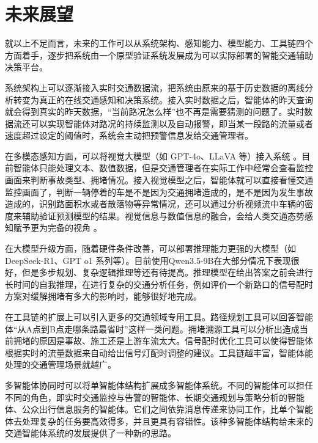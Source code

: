 \section{未来展望}

就以上不足而言，未来的工作可以从系统架构、感知能力、模型能力、工具链四个方面着手，逐步把系统由一个原型验证系统发展成为可以实际部署的智能交通辅助决策平台。

系统架构上可以逐渐接入实时交通数据流，把系统由原来的基于历史数据的离线分析转变为真正的在线交通感知和决策系统。接入实时数据之后，智能体的昨天查询就会得到真实的昨天数据，“当前路况怎么样”也不再是需要猜测的问题了。实时数据流还可以实现智能体对路况的持续监测以及自动报警，即当某一段路的流量或者速度超过设定的阈值时，系统会主动把预警信息发给交通管理者。

在多模态感知方面，可以将视觉大模型（如 GPT-4o、LLaVA 等）接入系统 。目前智能体只能处理文本、数值数据，但是交通管理者在实际工作中经常会查看监控画面来判断事故类型、拥堵情况。接入视觉模型之后，智能体就可以直接看懂交通监控画面了，判断一辆停着的车是不是因为交通拥堵造成的，是不是因为发生事故造成的，识别路面积水或者散落物等异常情况，还可以通过分析视频流中车辆的密度来辅助验证预测模型的结果。视觉信息与数值信息的融合，会给人类交通态势感知赋予更为完备的视角 。

在大模型升级方面，随着硬件条件改善，可以部署推理能力更强的大模型（如 DeepSeek-R1、GPT o1 系列等）。目前使用Qwen3.5-9B在大部分情况下表现很好，但是多步规划、复杂逻辑推理等还有待提高。推理模型在给出答案之前会进行长时间的自我推理，在进行复杂的交通分析任务，例如评价一个新路口的信号配时方案对缓解拥堵有多大的影响时，能够很好地完成。

在工具链的扩展上可以引入更多的交通领域专用工具。路径规划工具可以回答智能体“从A点到B点走哪条路最省时”这样一类问题。拥堵溯源工具可以分析出造成当前拥堵的原因是事故、施工还是上游车流太大。信号配时优化工具可以使得智能体根据实时的流量数据来自动给出信号灯配时调整的建议。工具链越丰富，智能体能处理的交通管理场景就越广。

多智能体协同时可以将单智能体结构扩展成多智能体系统。不同的智能体可以担任不同的角色，即实时交通监控与告警的智能体、长期交通规划与策略分析的智能体、公众出行信息服务的智能体。它们之间依靠消息传递来协同工作，比单个智能体去处理复杂的任务要高效得多，并且更具有容错性。该种多智能体结构给未来的交通智能体系统的发展提供了一种新的思路。